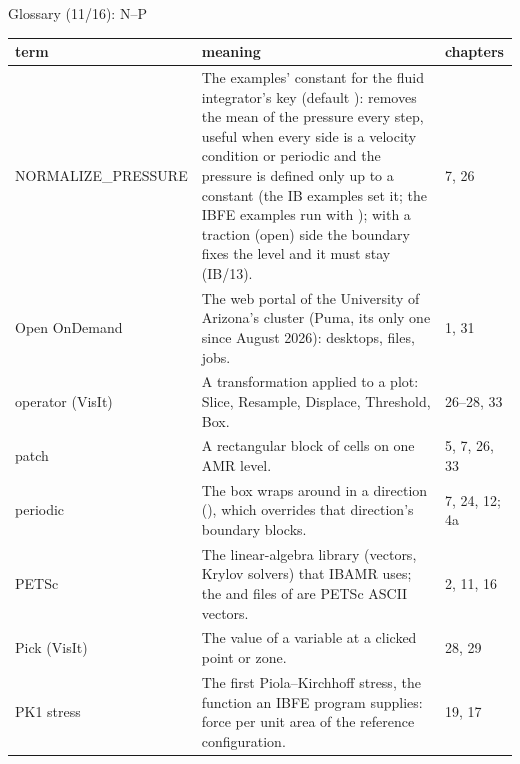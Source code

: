 \documentclass[aspectratio=169,11pt]{beamer}
\makeatletter
\newenvironment{glossarytable}{\scriptsize\renewcommand{\arraystretch}{1.08}%
  \begin{tabular}{@{}L{0.19\textwidth}L{0.63\textwidth}L{0.12\textwidth}@{}}\toprule
  term & meaning & chapters\\\midrule}{\bottomrule\end{tabular}}
\makeatother
\begin{document}
\begin{frame}{Glossary (11/16): N--P}
\label{fr:g11}
\begin{glossarytable}
NORMALIZE\_\allowbreak{}PRESSURE & The examples' constant for the fluid integrator's key  (default ):  removes the mean of the pressure every step, useful when every side is a velocity condition or periodic and the pressure is defined only up to a constant (the IB examples set it; the IBFE examples run with ); with a traction (open) side the boundary fixes the level and it must stay  (IB/13). & 7, 26\\
Open OnDemand & The web portal of the University of Arizona's cluster (Puma, its only one since August 2026): desktops, files, jobs. & 1, 31\\
operator (VisIt) & A transformation applied to a plot: Slice, Resample, Displace, Threshold, Box. & 26--28, 33\\
patch & A rectangular block of cells on one AMR level. & 5, 7, 26, 33\\
periodic & The box wraps around in a direction (), which overrides that direction's boundary blocks. & 7, 24, 12; 4a\\
PETSc & The linear-algebra library (vectors, Krylov solvers) that IBAMR uses; the  and  files of  are PETSc ASCII vectors. & 2, 11, 16\\
Pick (VisIt) & The value of a variable at a clicked point or zone. & 28, 29\\
PK1 stress & The first Piola--Kirchhoff stress, the function an IBFE program supplies: force per unit area of the reference configuration. & 19, 17\\
\end{glossarytable}
\end{frame}
\end{document}
